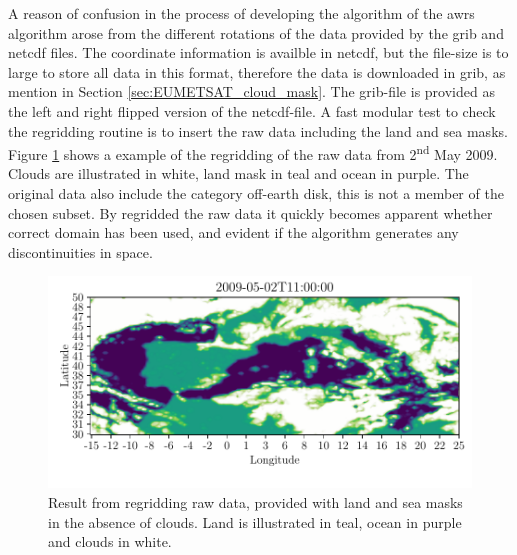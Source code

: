 A reason of confusion in the process of developing the algorithm of the \acrshort{awrs} algorithm arose from the different rotations of the data provided by the \acrshort{grib} and \acrshort{netcdf} files. The coordinate information is availble in \acrshort{netcdf}, but the file-size is to large to store all data in this format, therefore the data is downloaded in \acrshort{grib}, as mention in Section \ref{sec:EUMETSAT_cloud_mask}. The \acrshort{grib}-file is provided as the left and right flipped version of the  \acrshort{netcdf}-file. A fast modular test to check the regridding routine is to insert the raw data including the land and sea masks. Figure \ref{fig:visual_inspection_regridding} shows a example of the regridding of the raw data from 2\textsuperscript{nd} May 2009. Clouds are illustrated in white, land mask in teal and ocean in purple. The original data also include the category off-earth disk, this is not a member of the chosen subset. By regridded the raw data it quickly becomes apparent whether correct domain has been used, and evident if the algorithm generates any discontinuities in space. 
\begin{figure}
    \centering
    \includegraphics{python_figs/visual_regridding.pdf}
    \caption{Result from regridding raw data, provided with land and sea masks in the absence of clouds. Land is illustrated in teal, ocean in purple and clouds in white.}
    \label{fig:visual_inspection_regridding}
\end{figure}

